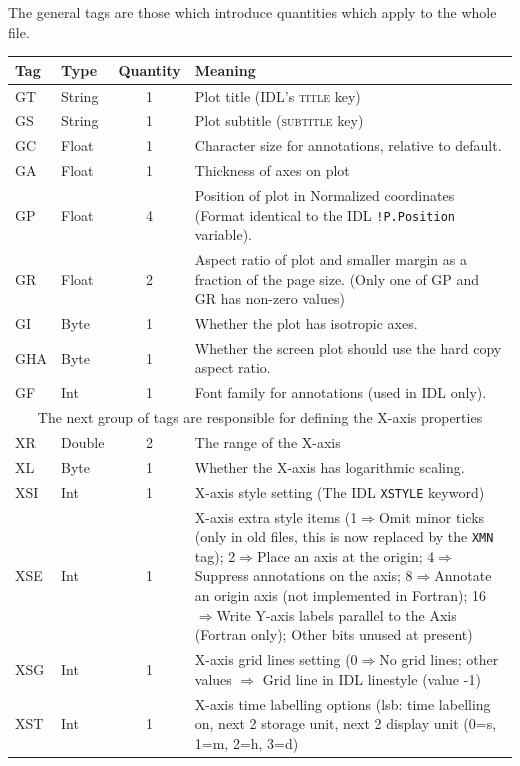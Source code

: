 \documentclass[english]{article}
\newcommand{\noun}[1]{\textsc{#1}}
\begin{document}
The general tags are those which introduce quantities which apply
to the whole file.

\begin{longtable}{|llcp{9cm}|}
  \hline Tag& Type& Quantity&
  Meaning\\
  \hline
  \endhead
  \hline
  \endfoot
  GT& String& 1&
  Plot title (IDL's \noun{title} key)\\
  GS& String& 1&
  Plot subtitle (\noun{subtitle} key)\\
  GC& Float& 1&
  Character size for annotations, relative to default.\\
  GA& Float & 1&
  Thickness of axes on plot\\
  GP& Float& 4& Position of plot in Normalized coordinates (Format
  identical to the
  IDL \texttt{!P.Position} variable).\\
  GR& Float& 2& Aspect ratio of plot and smaller margin as a fraction
  of the page
  size. (Only one of GP and GR has non-zero values)\\
  GI & Byte & 1 & Whether the plot has isotropic axes.\\
  GHA & Byte & 1 & Whether the screen plot should use the hard copy
  aspect ratio.\\
  GF & Int & 1 & Font family for annotations (used in IDL only).\\
  \hline \multicolumn{4}{|c|}{The next group of tags are responsible
    for
    defining the X-axis properties}\\
  \hline XR& Double& 2&
  The range of the X-axis\\
  XL & Byte & 1 & Whether the X-axis has logarithmic scaling.\\
  XSI& Int& 1&
  X-axis style setting (The IDL \texttt{XSTYLE} keyword)\\
  XSE& Int& 1& X-axis extra style items (1$\Rightarrow$Omit minor ticks
  (only in old files, this is now replaced by the \texttt{XMN} tag);
  2$\Rightarrow$Place an axis at the origin; 4$\Rightarrow$Suppress
  annotations on the
  axis; 8$\Rightarrow$Annotate an origin axis (not implemented in
  Fortran); 16$\Rightarrow$Write Y-axis labels parallel to the Axis
  (Fortran only); Other bits unused at present)\\
  XSG& Int& 1& X-axis grid lines setting (0$\Rightarrow$No grid lines;
  other values
  $\Rightarrow$ Grid line in IDL linestyle (value -1)\\
  XST& Int& 1& X-axis time labelling options (lsb: time labelling on,
  next 2 storage
  unit, next 2 display unit (0=s, 1=m, 2=h, 3=d)\\

\end{longtable}
\end{document}
